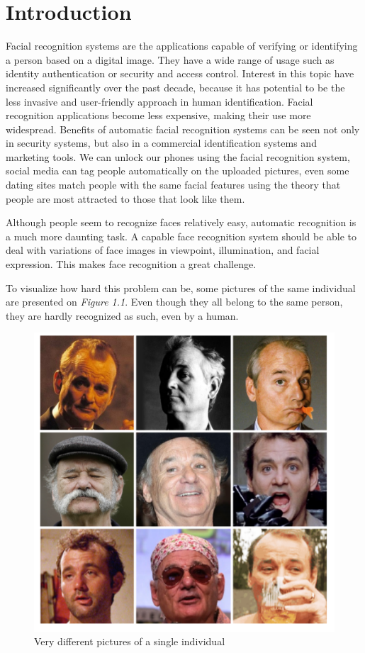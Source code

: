 \chapter{Introduction}
\label{cha:introduction}

Facial recognition systems are the applications capable of verifying or identifying a person based on a digital image. They have a wide range of usage such as identity authentication or security and access control.  Interest in this topic have increased significantly over the past decade, because it has potential to be the less invasive and user-friendly approach in human identification. Facial recognition applications become less expensive, making their use more widespread. Benefits of automatic facial recognition systems can be seen not only in security systems, but also in a commercial identification systems and marketing tools. We can unlock our phones using the facial recognition system, social media can tag people automatically on the uploaded pictures, even some dating sites match people with the same facial features using the theory that people are most attracted to those that look like them.

Although people seem to recognize faces relatively easy, automatic recognition is a much more daunting task. A capable face recognition system should be able to deal with variations of face images in viewpoint, illumination, and facial expression. This makes face recognition a great challenge. 

To visualize how hard this problem can be, some pictures of the same individual are presented on \textit{Figure 1.1}. Even though they all belong to the same person, they are hardly recognized as such, even by a human.

\begin{figure}[H]
\centering
\includegraphics[scale=0.5]{img/the_same_person.png}
\caption{Very different pictures of a single individual}
\end{figure}


